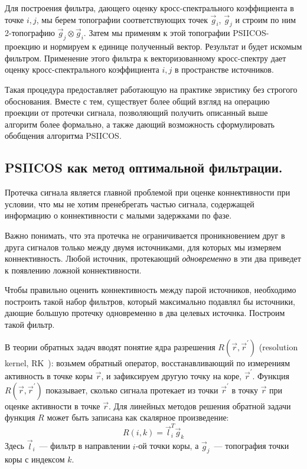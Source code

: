 Для построения фильтра, дающего оценку кросс-спектрального коэффициента в точке
$i, j$, мы берем топографии соответствующих точек $\vec{g}_i$, $\vec{g}_j$ и
строим по ним 2-топографию $\vec{g}_j \otimes \vec{g}_i$. Затем мы применям
к этой топографии PSIICOS-проекцию и нормируем к единице полученный вектор.
Результат и будет искомым фильтром. Применение этого фильтра к векторизованному кросс-спектру
дает оценку кросс-спектрального коэффициента $i, j$ в пространстве источников.

Такая процедура предоставляет работающую на практике эвристику без строгого обоснования.
Вместе с тем, существует более общий взгляд на операцию проекции от протечки сигнала,
позволяющий получить описанный выше алгоритм более формально, а также дающий возможность
сформулировать обобщения алгоритма PSIICOS.

\subsection{PSIICOS как метод оптимальной фильтрации.}

Протечка сигнала является главной проблемой при оценке коннективности при
условии, что мы не хотим пренебрегать частью сигнала, содержащей информацию
о коннективности с малыми задержками по фазе.

Важно понимать, что эта протечка не ограничивается проникновением друг в друга
сигналов только между двумя источниками, для которых мы измеряем
коннективность. Любой источник, протекающий \emph{одновременно} в эти два приведет
к появлению ложной коннективности.

Чтобы правильно оценить коннективность между парой источников,
необходимо построить такой набор фильтров, который максимально
подавлял бы источники, дающие большую протечку одновременно в два
целевых источнка. Построим такой фильтр.

В теории обратных задач вводят понятие ядра разрешения $R(\vec{r},
\vec{r}^{\prime})$ (resolution kernel, RK~\cite{Sekihara2007}): возьмем
обратный оператор, восстанавливающий по измерениям активность в точке коры
$\vec{r}$, и зафиксируем другую точку на коре, $\vec{r}^{\prime}$.  Функция
$R(\vec{r}, \vec{r}^{\prime})$ показывает, сколько сигнала протекает из точки
$\vec{r}^{\prime}$ в точку $\vec{r}$ при оценке активности в точке $\vec{r}$.
Для линейных методов решения обратной задачи функция $R$ может быть записана как
скалярное произведение:
\begin{equation}
    R(i, k) = \vec{l}_i^T \vec{g}_k
    \label{eq:resolution_kernel}
\end{equation}
Здесь $\vec{l}_i$~--- фильтр в направлении $i$-ой точки коры, а
$\vec{g}_j$~--- топография точки коры с индексом $k$.

